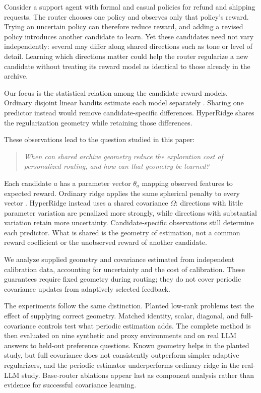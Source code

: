 \documentclass{article} %
\begin{document}
Consider a support agent with formal and casual policies for refund and
shipping requests. The router chooses one policy and observes only that
policy's reward. Trying an uncertain policy can therefore reduce reward, and
adding a revised policy introduces another candidate to learn. Yet these
candidates need not vary independently: several may differ along shared
directions such as tone or level of detail. Learning which directions matter
could help the router regularize a new candidate without treating its reward
model as identical to those already in the archive.

Our focus is the statistical relation among the candidate reward models.
Ordinary disjoint linear bandits estimate each model separately
\citep{li2010contextual,chu2011linucb}. Sharing one predictor instead would
remove candidate-specific differences. HyperRidge shares the regularization
geometry while retaining those differences.

These observations lead to the question studied in this paper:
\begin{quote}
\emph{When can shared archive geometry reduce the exploration cost of
personalized routing, and how can that geometry be learned?}
\end{quote}

Each candidate $a$ has a parameter vector $\theta_a$ mapping observed features
to expected reward. Ordinary ridge applies the same spherical penalty to
every vector \citep{abbasi2011oful,chu2011linucb}. HyperRidge instead uses a
shared covariance $\Omega$: directions with little parameter variation are
penalized more strongly, while directions with substantial variation retain
more uncertainty. Candidate-specific observations still determine each
predictor. What is shared is the geometry of estimation, not a common reward
coefficient or the unobserved reward of another candidate.

We analyze supplied geometry and covariance estimated from independent
calibration data, accounting for uncertainty and the cost of calibration.
These guarantees require fixed geometry during routing; they do not cover
periodic covariance updates from adaptively selected feedback.

The experiments follow the same distinction. Planted low-rank problems test
the effect of supplying correct geometry. Matched identity, scalar,
diagonal, and full-covariance controls test what periodic estimation adds.
The complete method is then evaluated on nine synthetic and proxy
environments and on real LLM answers to held-out preference questions.
Known geometry helps in the planted study, but full covariance does not
consistently outperform simpler adaptive regularizers, and the periodic estimator underperforms
ordinary ridge in the real-LLM study. Base-router ablations appear last as
component analysis rather than evidence for successful covariance learning.
\end{document}

